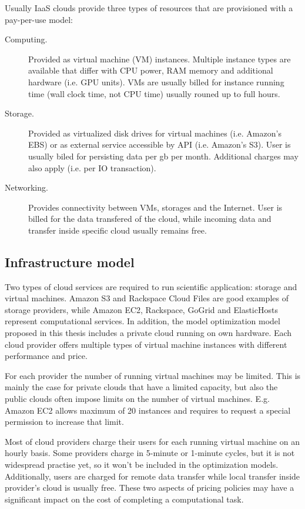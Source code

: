 Usually IaaS clouds provide three types of resources that are provisioned with a pay-per-use model: 
\begin{description}
  \item[Computing.] Provided as virtual machine (VM) instances. Multiple instance types are available that differ with CPU power, RAM memory and additional hardware (i.e. GPU units). VMs are usually billed for instance running time (wall clock time, not CPU time) usually rouned up to full hours.
  \item[Storage.] Provided as virtualized disk drives for virtual machines (i.e. Amazon's EBS) or as external service accessible by API (i.e. Amazon's S3). User is usually biled for persisting data per gb per month. Additional charges may also apply (i.e. per IO transaction).
  \item[Networking.] Provides connectivity between VMs, storages and the Internet. User is billed for the data transfered of the cloud, while incoming data and transfer inside specific cloud usually remains free.
\end{description}

\subsection{Infrastructure model}
\label{sec:intro:cloud:model}

Two types of cloud services are required to run scientific application: storage and virtual machines. Amazon S3 and Rackspace Cloud Files are good examples of storage providers, while Amazon EC2, Rackspace, GoGrid and ElasticHosts represent computational services. In addition, the model optimization model proposed in this thesis includes a private cloud running on own hardware. Each cloud provider offers multiple types of virtual machine instances with different performance and price.

For each provider the number of running virtual machines may be limited. This is mainly the case for private clouds that have a limited capacity, but also the public clouds often impose limits on the number of virtual machines. E.g. Amazon EC2 allows maximum of 20 instances and requires to request a special permission to increase that limit. 

Most of cloud providers charge their users for each running virtual machine on an hourly basis. Some providers charge in 5-minute or 1-minute cycles, but it is not widespread practise yet, so it won't be included in the optimization models. Additionally, users are charged for remote data transfer while local transfer inside provider's cloud is usually free. These two aspects of pricing policies may have a significant impact on the cost of completing a computational task.

